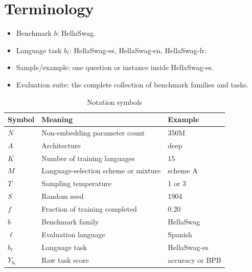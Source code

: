\section{Terminology}

\begin{itemize}
    \item Benchmark \(b\): HellaSwag.
    \item Language task \(b_\ell\): HellaSwag-es, HellaSwag-en, HellaSwag-fr.
    \item Sample/example: one question or instance inside HellaSwag-es.
    \item Evaluation suite: the complete collection of benchmark families and tasks.
\end{itemize}

\begin{table}[h]
    \centering
    \caption{Notation symbols}
    \label{tab:notation-symbols}
    \begin{tabular}{lll}
        \hline
        \textbf{Symbol} & \textbf{Meaning} & \textbf{Example} \\
        \hline
        \(N\) & Non-embedding parameter count & 350M \\
        \hline
        \(A\) & Architecture & deep \\
        \hline
        \(K\) & Number of training languages & 15 \\
        \hline
        \(M\) & Language-selection scheme or mixture & scheme A \\
        \hline
        \(T\) & Sampling temperature & 1 or 3 \\
        \hline
        \(S\) & Random seed & 1904 \\
        \hline
        \(f\) & Fraction of training completed & 0.20 \\
        \hline
        \(b\) & Benchmark family & HellaSwag \\
        \hline
        \(\ell\) & Evaluation language & Spanish \\
        \hline
        \(b_\ell\) & Language task & HellaSwag-es \\
        \hline
        \(Y_{b_\ell}\) & Raw task score & accuracy or BPB \\
        \hline
    \end{tabular}
\end{table}


